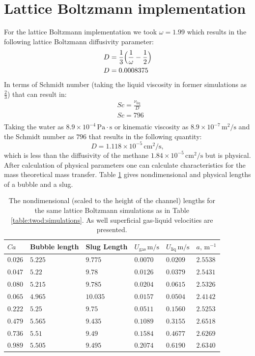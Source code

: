 \documentclass{article}
\begin{document}
\section{Lattice Boltzmann implementation}
For the lattice Boltzmann implementation we took $\omega=1.99$ which results in the following
lattice Boltzmann diffusivity parameter:
\begin{equation}
\begin{aligned}
&D=\frac{1}{3}\Bigl(\frac{1}{\omega}-\frac{1}{2}\Bigr)\\
&D=0.0008375
\end{aligned}
\end{equation}
In terms of Schmidt number (taking the liquid viscosity in former simulations as $\frac{2}{3}$) that
can result in:
\begin{equation}
\begin{aligned}
&Sc=\frac{\nu_{\mathrm{liq}}}{D}\\
&Sc=796\\
\end{aligned}
\end{equation}
Taking the water as $8.9 \times 10^{-4}\,\mathrm{Pa\cdot s}$ or kinematic viscosity as $8.9 \times
10^{-7} \,\mathrm{m^2/s}$ and the Schmidt number as $796$ that results in the following quantity:
\begin{equation}
D=1.118\times 10^{-5}\,\mathrm{cm^2/s},
\end{equation}
which is less than the diffusivity of the methane $1.84\times 10^{-5}\,\mathrm{cm^2/s}$ but is
physical. After calculation of physical parameters one can calculate characteristics for the mass
theoretical mass transfer. Table \ref{table:lengths} gives nondimensional and physical lengths of a
bubble and a slug.
\begin{table}
\begin{tabularx}{\textwidth}{|X|X|X|X|X|X|}
\hline
$Ca$&Bubble length& Slug Length&
$U_{\mathrm{gas}}\,\mathrm{m/s}$&$U_{\mathrm{liq}}\,\mathrm{m/s}$&$a,\,\mathrm{m^{-1}}$\\
\hline
$0.026$&$5.225$&$9.775$ &$0.0070$ &$0.0209$&$2.5538$\\
$0.047$&$5.22$ &$9.78$  &$0.0126$ &$0.0379$&$2.5431$\\
$0.080$&$5.215$&$9.785$ &$0.0204$ &$0.0615$&$2.5326$\\
$0.065$&$4.965$&$10.035$&$0.0157$ &$0.0504$&$2.4142$\\
$0.222$&$5.25$ &$9.75$  &$0.0511$ &$0.1560$&$2.5253$\\
$0.479$&$5.565$&$9.435$ &$0.1089$ &$0.3155$&$2.6518$\\
$0.736$&$5.51$ &$9.49$  &$0.1584$ &$0.4677$&$2.6269$\\
$0.989$&$5.505$&$9.495$ &$0.2074$ &$0.6190$&$2.6340$\\
\hline
\end{tabularx}

\caption{The nondimensional (scaled to the height of the channel) lengths for the same
lattice Boltzmann simulations as in Table \ref{table:twod:simulations}. As well superficial
gas-liquid velocities are presented.\label{table:lengths}}
\end{table}
\end{document}
